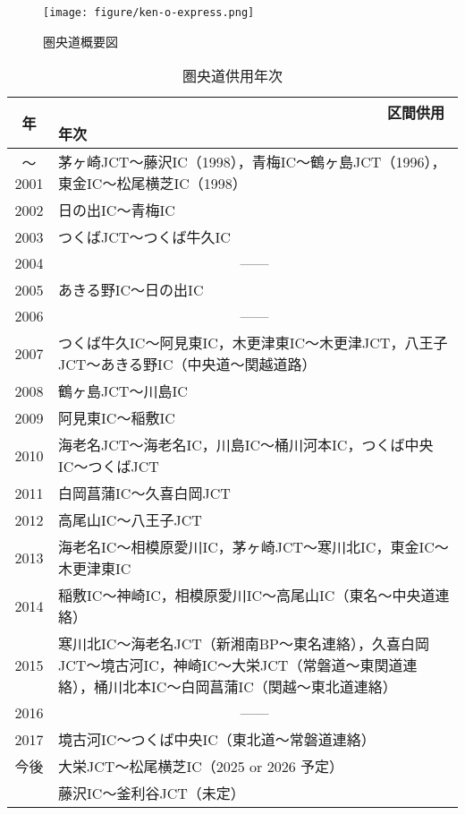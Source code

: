 \begin{figure}[H]
  \centering
  \texttt{[image: figure/ken-o-express.png]}
  \caption{圏央道概要図}
  \label{fig:ken-o-express}
\end{figure}
\newpage
\begin{table}[h]
  \begin{center}
    \caption{圏央道供用年次}
    \vspace{1.5zw}
    \begin{tabular}{|c|p{12cm}|}\hline \label{圏央道供用年次}
      年 & ~~~~~~~~~~~~~~~~~~~~~~~~~~~~~~~~~~~~~~~~区間供用年次 \\ \hline \hline
      〜2001 & 茅ヶ崎JCT〜藤沢IC（1998），青梅IC〜鶴ヶ島JCT（1996），東金IC〜松尾横芝IC（1998） \\ \hline
      2002 & 日の出IC〜青梅IC \\ \hline
      2003 & つくばJCT〜つくば牛久IC \\ \hline
      2004 & \multicolumn{1}{|c|}{------} \\ \hline
      2005 & あきる野IC〜日の出IC \\ \hline
      2006 & \multicolumn{1}{|c|}{------} \\ \hline
      2007 & つくば牛久IC〜阿見東IC，木更津東IC〜木更津JCT，八王子JCT〜あきる野IC（中央道〜関越道路） \\ \hline
      2008 & 鶴ヶ島JCT〜川島IC \\ \hline
      2009 & 阿見東IC〜稲敷IC \\ \hline
      2010 & 海老名JCT〜海老名IC，川島IC〜桶川河本IC，つくば中央IC〜つくばJCT \\ \hline
      2011 & 白岡菖蒲IC〜久喜白岡JCT \\ \hline
      2012 & 高尾山IC〜八王子JCT \\ \hline
      2013 & 海老名IC〜相模原愛川IC，茅ヶ崎JCT〜寒川北IC，東金IC〜木更津東IC \\ \hline
      2014 & 稲敷IC〜神崎IC，相模原愛川IC〜高尾山IC（東名〜中央道連絡） \\ \hline
      2015 & 寒川北IC〜海老名JCT（新湘南BP〜東名連絡），久喜白岡JCT〜境古河IC，神崎IC〜大栄JCT（常磐道〜東関道連絡），桶川北本IC〜白岡菖蒲IC（関越〜東北道連絡） \\ \hline
      2016 & \multicolumn{1}{|c|}{------} \\ \hline
      2017 & 境古河IC〜つくば中央IC（東北道〜常磐道連絡） \\ \hline
      今後 & 大栄JCT〜松尾横芝IC（2025 or 2026 予定）\\ \hline
      & 藤沢IC〜釜利谷JCT（未定） \\ \hline
    \end{tabular}
  \end{center}
\end{table}

